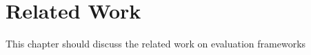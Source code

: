 \chapter{Related Work}
\label{ChapterRelatedWork}
This chapter should discuss the related work on evaluation frameworks